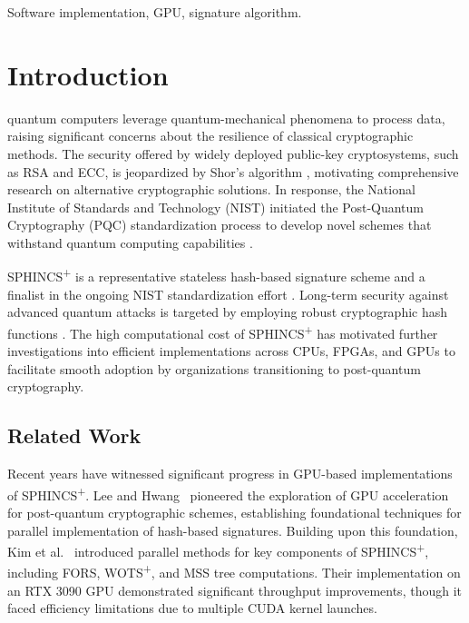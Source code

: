 \documentclass[journal]{IEEEtran}
\begin{document}
\begin{IEEEkeywords}
  Software implementation, GPU, signature algorithm.
\end{IEEEkeywords}

\section{Introduction}
\label{sec:intro}

 quantum computers leverage quantum-mechanical phenomena to process data, raising significant concerns about the resilience of classical cryptographic methods.
The security offered by widely deployed public-key cryptosystems, such as RSA and ECC, is jeopardized by Shor's algorithm \cite{Shor1994}, motivating comprehensive research on alternative cryptographic solutions. In response, the National Institute of Standards and Technology (NIST) initiated the Post-Quantum Cryptography (PQC) standardization process to develop novel schemes that withstand quantum computing capabilities \cite{NIST2016}.

SPHINCS\textsuperscript{+} is a representative stateless hash-based signature scheme and a finalist in the ongoing NIST standardization effort \cite{Turan}. Long-term security against advanced quantum attacks is targeted by employing robust cryptographic hash functions \cite{Bernstein2019}. The high computational cost of SPHINCS\textsuperscript{+} has motivated further investigations into efficient implementations across CPUs, FPGAs, and GPUs \cite{Joseph2022} to facilitate smooth adoption by organizations transitioning to post-quantum cryptography.

\subsection{Related Work}

Recent years have witnessed significant progress in GPU-based implementations of SPHINCS\textsuperscript{+}. Lee and Hwang~\cite{Lee2022} pioneered the exploration of GPU acceleration for post-quantum cryptographic schemes, establishing foundational techniques for parallel implementation of hash-based signatures. Building upon this foundation, Kim et al.~\cite{Kim2024} introduced parallel methods for key components of SPHINCS\textsuperscript{+}, including FORS, WOTS\textsuperscript{+}, and MSS tree computations. Their implementation on an RTX 3090 GPU demonstrated significant throughput improvements, though it faced efficiency limitations due to multiple CUDA kernel launches.
\end{document}
